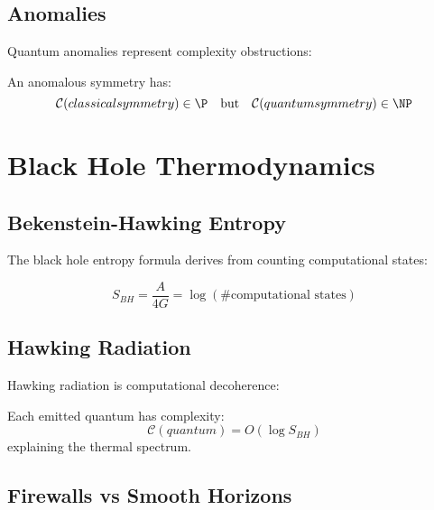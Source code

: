 \documentclass[12pt,a4paper]{article}
\newcommand{\comp}[1]{\mathcal{C}(#1)}
\begin{document}
\subsection{Anomalies}

Quantum anomalies represent complexity obstructions:

\begin{proposition}
An anomalous symmetry has:
\begin{equation}
\comp{classical symmetry} \in \P \quad \text{but} \quad \comp{quantum symmetry} \in \NP
\end{equation}
\end{proposition}

\section{Black Hole Thermodynamics}

\subsection{Bekenstein-Hawking Entropy}

The black hole entropy formula derives from counting computational states:

\begin{theorem}
\begin{equation}
S_{BH} = \frac{A}{4G} = \log(\#\text{computational states})
\end{equation}
\end{theorem}

\subsection{Hawking Radiation}

Hawking radiation is computational decoherence:

\begin{proposition}
Each emitted quantum has complexity:
\begin{equation}
\comp{quantum} = O(\log S_{BH})
\end{equation}
explaining the thermal spectrum.
\end{proposition}

\subsection{Firewalls vs Smooth Horizons}
\end{document}

